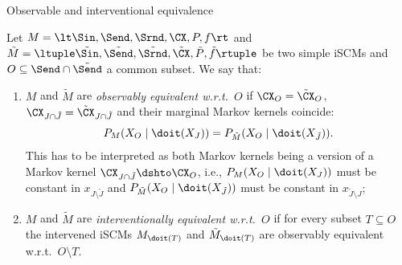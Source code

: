 \begin{frame}{Observable and interventional equivalence}
  \begin{Def}[\ref{def:scm_obs_interv_equiv}]
  Let $M = \lt \Sin, \Send, \Srnd, \CX, P, f \rt$ and
  $\tilde{M} = \ltuple \tilde{\Sin}, \tilde{\Send}, \tilde{\Srnd}, \tilde{\CX}, \tilde{P}, \tilde{f} \rtuple$ be two simple iSCMs
  and $O \subseteq \Send \cap \tilde{\Send}$ a common subset.
  We say that:
  \begin{enumerate}
    \item $M$ and $\tilde{M}$ are \emph{observably equivalent w.r.t.\ $O$} if $\CX_O = \tilde{\CX}_O$, $\CX_{J \cap \tilde{J}} = \tilde{\CX}_{J \cap \tilde{J}}$ and their marginal Markov kernels coincide:
      $$P_{M}(X_O \mid \doit(X_J)) = P_{\tilde{M}}(X_O \mid \doit(X_{\tilde J})).$$
    This has to be interpreted as both Markov kernels being a version of a Markov kernel $\CX_{J \cap \tilde{J}} \dshto \CX_O$,
    i.e., $P_{M}(X_O \mid \doit(X_J))$ must be constant in $x_{J \setminus \tilde{J}}$ and
    $P_{\tilde{M}}(X_O \mid \doit(X_{\tilde{J}}))$ must be constant in $x_{\tilde{J} \setminus J}$;
    \item $M$ and $\tilde{M}$ are \emph{interventionally equivalent w.r.t.\ $O$} if for every subset $T \subseteq O$ the intervened iSCMs $M_{\doit(T)}$ and $\tilde{M}_{\doit(T)}$ are observably equivalent w.r.t.\ $O \setminus T$.
  \end{enumerate}
\end{Def}
\end{frame}


